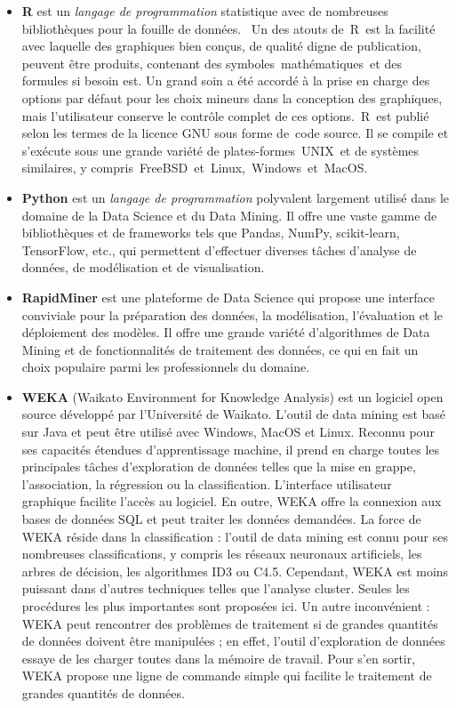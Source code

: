 \documentclass[a4paper,14pt]{article}
\begin{document}
    \begin{itemize}
        \item \textbf{R} est un \emph{langage de programmation} statistique avec de nombreuses bibliothèques pour la fouille de données.  Un des atouts de R est la facilité avec laquelle des graphiques bien conçus, de qualité digne de publication, peuvent être produits, contenant des symboles mathématiques et des formules si besoin est. Un grand soin a été accordé à la prise en charge des options par défaut pour les choix mineurs dans la conception des graphiques, mais l'utilisateur conserve le contrôle complet de ces options. R est publié selon les termes de la licence GNU sous forme de code source. Il se compile et s'exécute sous une grande variété de plates-formes UNIX et de systèmes similaires, y compris FreeBSD et Linux, Windows et MacOS.
        
        \item \textbf{Python} est un \emph{langage de programmation} polyvalent largement utilisé dans le domaine de la Data Science et du Data Mining. Il offre une vaste gamme de bibliothèques et de frameworks tels que Pandas, NumPy, scikit-learn, TensorFlow, etc., qui permettent d’effectuer diverses tâches d’analyse de données, de modélisation et de visualisation.
    
        \item \textbf{RapidMiner} est une plateforme de Data Science qui propose une interface conviviale pour la préparation des données, la modélisation, l’évaluation et le déploiement des modèles. Il offre une grande variété d’algorithmes de Data Mining et de fonctionnalités de traitement des données, ce qui en fait un choix populaire parmi les professionnels du domaine.
    
        
        \item \textbf{WEKA} (Waikato Environment for Knowledge Analysis) est un logiciel open source développé par l'Université de Waikato. L'outil de data mining est basé sur Java et peut être utilisé avec Windows, MacOS et Linux. Reconnu pour ses capacités étendues d'apprentissage machine, il prend en charge toutes les principales tâches d'exploration de données telles que la mise en grappe, l'association, la régression ou la classification. L'interface utilisateur graphique facilite l'accès au logiciel. En outre, WEKA offre la connexion aux bases de données SQL et peut traiter les données demandées. La force de WEKA réside dans la classification : l'outil de data mining est connu pour ses nombreuses classifications, y compris les réseaux neuronaux artificiels, les arbres de décision, les algorithmes ID3 ou C4.5. Cependant, WEKA est moins puissant dans d'autres techniques telles que l'analyse cluster. Seules les procédures les plus importantes sont proposées ici. Un autre inconvénient : WEKA peut rencontrer des problèmes de traitement si de grandes quantités de données doivent être manipulées ; en effet, l'outil d'exploration de données essaye de les charger toutes dans la mémoire de travail. Pour s'en sortir, WEKA propose une ligne de commande simple qui facilite le traitement de grandes quantités de données. 
    

\end{itemize}
\end{document}
